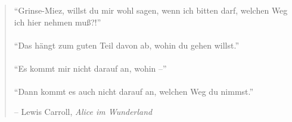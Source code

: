 
\newpage \vspace*{4cm}
\thispagestyle{empty}
\begin{quotation}
\begin{center}
  \large
  \enquote{Grinse-Miez, willst du mir wohl sagen, wenn ich bitten darf, welchen Weg ich hier nehmen muß?!} \\~\\
  \enquote{Das hängt zum guten Teil davon ab, wohin du gehen willst.} \\~\\
  \enquote{Es kommt mir nicht darauf an, wohin --} \\~\\
  \enquote{Dann kommt es auch nicht darauf an, welchen Weg du nimmst.}
\end{center}
\begin{flushright} -- Lewis Carroll, \textit{Alice im Wunderland}\end{flushright}
\end{quotation}
